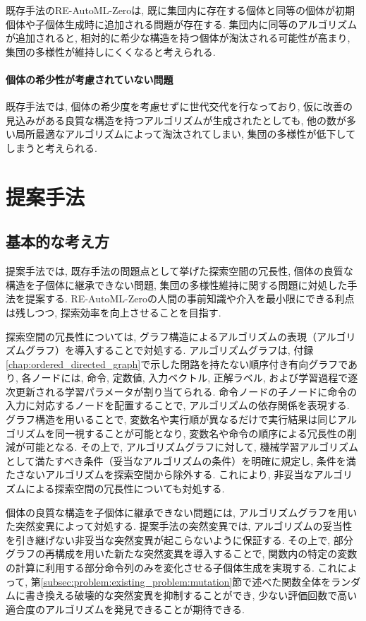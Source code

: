 \documentclass[11pt,oneside,openany,report]{jsbook}
\begin{document}
既存手法のRE-AutoML-Zeroは, 既に集団内に存在する個体と同等の個体が初期個体や子個体生成時に追加される問題が存在する. 集団内に同等のアルゴリズムが追加されると, 相対的に希少な構造を持つ個体が淘汰される可能性が高まり, 集団の多様性が維持しにくくなると考えられる.

\subsubsection{個体の希少性が考慮されていない問題}

既存手法では, 個体の希少度を考慮せずに世代交代を行なっており, 仮に改善の見込みがある良質な構造を持つアルゴリズムが生成されたとしても, 他の数が多い局所最適なアルゴリズムによって淘汰されてしまい, 集団の多様性が低下してしまうと考えられる.

\chapter{提案手法}\label{chap:proposed}

\section{基本的な考え方}

提案手法では, 既存手法の問題点として挙げた探索空間の冗長性, 個体の良質な構造を子個体に継承できない問題, 集団の多様性維持に関する問題に対処した手法を提案する. RE-AutoML-Zeroの人間の事前知識や介入を最小限にできる利点は残しつつ, 探索効率を向上させることを目指す.

探索空間の冗長性については, グラフ構造によるアルゴリズムの表現（アルゴリズムグラフ）を導入することで対処する. アルゴリズムグラフは, 付録\ref{chap:ordered_directed_graph}で示した閉路を持たない順序付き有向グラフであり, 各ノードには, 命令, 定数値, 入力ベクトル, 正解ラベル, および学習過程で逐次更新される学習パラメータが割り当てられる. 命令ノードの子ノードに命令の入力に対応するノードを配置することで, アルゴリズムの依存関係を表現する. グラフ構造を用いることで, 変数名や実行順が異なるだけで実行結果は同じアルゴリズムを同一視することが可能となり, 変数名や命令の順序による冗長性の削減が可能となる. その上で, アルゴリズムグラフに対して, 機械学習アルゴリズムとして満たすべき条件（妥当なアルゴリズムの条件）を明確に規定し, 条件を満たさないアルゴリズムを探索空間から除外する. これにより, 非妥当なアルゴリズムによる探索空間の冗長性についても対処する.

個体の良質な構造を子個体に継承できない問題には, アルゴリズムグラフを用いた突然変異によって対処する. 提案手法の突然変異では, アルゴリズムの妥当性を引き継げない非妥当な突然変異が起こらないように保証する. その上で, 部分グラフの再構成を用いた新たな突然変異を導入することで, 関数内の特定の変数の計算に利用する部分命令列のみを変化させる子個体生成を実現する. これによって, 第\ref{subsec:problem:existing_problem:mutation}節で述べた関数全体をランダムに書き換える破壊的な突然変異を抑制することができ, 少ない評価回数で高い適合度のアルゴリズムを発見できることが期待できる.
\end{document}
